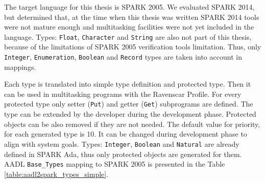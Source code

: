 The target language for this thesis is SPARK 2005. We evaluated SPARK 2014, but determined that, at the time when this thesis was written SPARK 2014 tools were not mature enough and multitasking facilities were not yet included in the language. Types: \lstinline{Float}, \lstinline{Character} and \lstinline{String} are also not part of this thesis, because of the limitations of SPARK 2005 verification tools limitation. Thus, only \lstinline{Integer}, \lstinline{Enumeration}, \lstinline{Boolean} and \lstinline{Record} types are taken into account in mappings.

Each type is translated into simple type definition and protected type. Then it can be used in multitasking programs with the Ravenscar Profile. For every protected type only setter (\lstinline{Put}) and getter (\lstinline{Get}) subprograms are defined. The type can be extended by the developer during the development phase. Protected objects can be also removed if they are not needed. The default value for priority, for each generated type is 10. It can be changed during development phase to align with system goals. Types: \lstinline{Integer}, \lstinline{Boolean} and \lstinline{Natural} are already defined in SPARK Ada, thus only protected objects are generated for them. AADL \lstinline{Base_Types} mapping to SPARK 2005 is presented in the Table \ref{table:aadl2spark_types_simple}.

